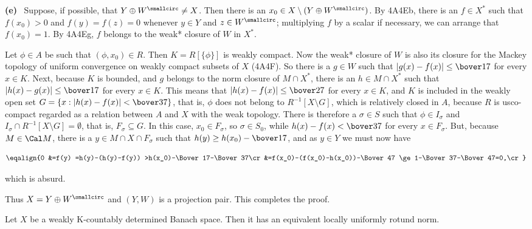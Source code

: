 {\medskip

{\bf (e)} \Quer\ Suppose, if possible, that
$Y\oplus W^{\smallcirc}\ne X$.   Then there is an
$x_0\in X\setminus(Y\oplus W^{\smallcirc})$.   By 4A4Eb, there is an
$f\in X^*$ such that $f(x_0)>0$ and $f(y)=f(z)=0$ whenever $y\in Y$ and
$z\in W^{\smallcirc}$;  multiplying $f$ by a scalar if necessary, we can
arrange that $f(x_0)=1$.   By 4A4Eg, $f$ belongs to the weak*
closure of $W$ in $X^*$.

Let $\phi\in A$ be such that $(\phi,x_0)\in R$.   Then $K=R[\{\phi\}]$
is weakly compact.   Now the weak* closure of $W$ is also its closure
for the Mackey topology of uniform convergence on weakly compact subsets
of $X$ (4A4F).   So there is a $g\in W$ such that
$|g(x)-f(x)|\le\bover17$ for every $x\in K$.   Next, because $K$ is
bounded, and $g$ belongs to the norm closure of $M\cap X^*$, there is an
$h\in M\cap X^*$ such that $|h(x)-g(x)|\le\bover17$ for every $x\in K$.
This means that $|h(x)-f(x)|\le\bover27$ for every
$x\in K$, and $K$ is included in the weakly open set
$G=\{x:|h(x)-f(x)|<\bover37\}$, that is, $\phi$ does not belong to
$R^{-1}[X\setminus G]$, which is relatively closed in $A$, because $R$
is usco-compact regarded as a relation between $A$ and $X$ with the weak
topology.   There is therefore a $\sigma\in S$ such that
$\phi\in I_{\sigma}$ and
$I_{\sigma}\cap R^{-1}[X\setminus G]=\emptyset$, that is,
$F_{\sigma}\subseteq G$.   In this case, $x_0\in F_{\sigma}$, so
$\sigma\in S_0$, while $h(x)-f(x)<\bover37$ for every
$x\in F_{\sigma}$.   But, because $M\in\Cal M$, there is a
$y\in M\cap X\cap F_{\sigma}$ such that $h(y)\ge h(x_0)-\bover17$, and as $y\in Y$ we must now have

$$\eqalign{0
&=f(y)
=h(y)-(h(y)-f(y))
>h(x_0)-\Bover17-\Bover37\cr
&=f(x_0)-(f(x_0)-h(x_0))-\Bover47
\ge 1-\Bover37-\Bover47=0,\cr}$$

\noindent which is absurd.\ \Bang

Thus $X=Y\oplus W^{\smallcirc}$ and $(Y,W)$ is a projection pair.   This
completes the proof.
}%

 Let $X$ be a weakly K-countably determined Banach
space.   Then it has an equivalent locally uniformly rotund norm.

